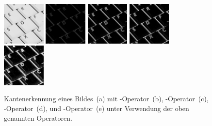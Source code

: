 \begin{figure}[H]
  \label{fig:edge-detection}
  \centering
  \includegraphics[width=0.1925\textwidth]{img/basics/edge-detection/original}
  \includegraphics[width=0.1925\textwidth]{img/basics/edge-detection/roberts}
  \includegraphics[width=0.1925\textwidth]{img/basics/edge-detection/prewitt}
  \includegraphics[width=0.1925\textwidth]{img/basics/edge-detection/sobel}
  \includegraphics[width=0.1925\textwidth]{img/basics/edge-detection/scharr}
  \caption[Kantenerkennung]{Kantenerkennung eines Bildes\protect\footnotemark~(a) mit -Operator~(b), -Operator~(c), -Operator~(d), und -Operator~(e) unter Verwendung der oben genannten Operatoren.}
\end{figure}

